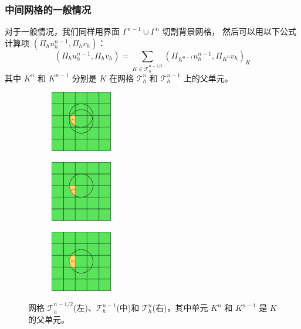 \documentclass[notheorems,serif]{beamer}
\begin{document}
\begin{frame}
    \frametitle{中间网格的一般情况}
对于一般情况，我们同样用界面 $\Gamma^{n-1}\cup\Gamma^n$ 切割背景网格，
然后可以用以下公式计算项 $(\Pi_h u_h^{n-1}, \Pi_h v_h)$：
$$
(\Pi_h u_h^{n-1}, \Pi_h v_h) = \sum_{K\in \mathcal{T}_h^{n-1/2}}
(\Pi_{K^{n-1}}u_h^{n-1}, \Pi_{K^n}v_h)_{K}
$$
其中 $K^{n}$ 和 $K^{n-1}$ 分别是 $K$ 在网格 $\mathcal{T}_h^n$ 和 $\mathcal{T}_h^{n-1}$ 上的父单元。

\begin{figure}[h]
\centering
\begin{subfigure}{.3\textwidth}
    \centering
    \includegraphics[width=1.05in]{../figures/movingmaxwell/meshncut.pdf}
\end{subfigure}
\begin{subfigure}{.3\textwidth}
    \centering
    \includegraphics[width=1.05in]{../figures/movingmaxwell/meshn_1.pdf}
\end{subfigure}
\begin{subfigure}{.3\textwidth}
    \centering
     \includegraphics[width=1.05in]{../figures/movingmaxwell/meshn.pdf}
\end{subfigure}
\caption{网格 $\mathcal{T}_h^{n-1/2}$(左)、$\mathcal{T}_h^{n-1}$(中)和 $\mathcal{T}_h^{n}$(右)，其中单元 $K^{n}$ 和 $K^{n-1}$ 是 $K$ 的父单元。}
\end{figure}
\end{frame}
\end{document}
